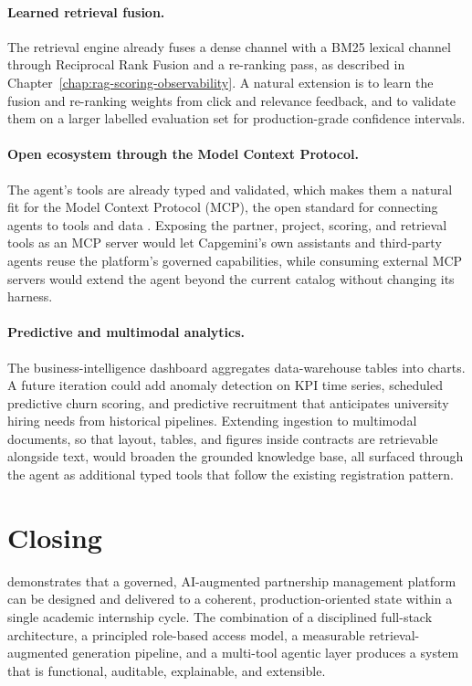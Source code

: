 \paragraph{Learned retrieval fusion.}
The retrieval engine already fuses a dense channel with a BM25 lexical channel through Reciprocal Rank Fusion and a re-ranking pass, as described in Chapter~\ref{chap:rag-scoring-observability}. A natural extension is to learn the fusion and re-ranking weights from click and relevance feedback, and to validate them on a larger labelled evaluation set for production-grade confidence intervals.

\paragraph{Open ecosystem through the Model Context Protocol.}
The agent's tools are already typed and validated, which makes them a natural fit for the Model Context Protocol (MCP), the open standard for connecting agents to tools and data . Exposing the partner, project, scoring, and retrieval tools as an MCP server would let Capgemini's own assistants and third-party agents reuse the platform's governed capabilities, while consuming external MCP servers would extend the agent beyond the current catalog without changing its harness.

\paragraph{Predictive and multimodal analytics.}
The business-intelligence dashboard aggregates data-warehouse tables into charts. A future iteration could add anomaly detection on KPI time series, scheduled predictive churn scoring, and predictive recruitment that anticipates university hiring needs from historical pipelines. Extending ingestion to multimodal documents, so that layout, tables, and figures inside contracts are retrievable alongside text, would broaden the grounded knowledge base, all surfaced through the agent as additional typed tools that follow the existing registration pattern.

\section*{Closing}

\projectname{} demonstrates that a governed, AI-augmented partnership management platform can be designed and delivered to a coherent, production-oriented state within a single academic internship cycle. The combination of a disciplined full-stack architecture, a principled role-based access model, a measurable retrieval-augmented generation pipeline, and a multi-tool agentic layer produces a system that is functional, auditable, explainable, and extensible.

